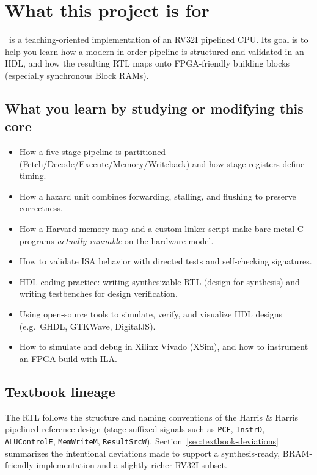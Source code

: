 \section{What this project is for}

\ProjectName\ is a teaching-oriented implementation of an RV32I pipelined CPU.
Its goal is to help you learn how a modern in-order pipeline is structured and
validated in an HDL, and how the resulting RTL maps onto FPGA-friendly building
blocks (especially synchronous Block RAMs).

\subsection{What you learn by studying or modifying this core}
\begin{itemize}[leftmargin=*]
  \item How a five-stage pipeline is partitioned (Fetch/Decode/Execute/Memory/Writeback) and how stage registers define timing.
  \item How a hazard unit combines forwarding, stalling, and flushing to preserve correctness.
  \item How a Harvard memory map and a custom linker script make bare-metal C programs \emph{actually runnable} on the hardware model.
  \item How to validate ISA behavior with directed tests and self-checking signatures.
  \item HDL coding practice: writing synthesizable RTL (design for synthesis) and writing testbenches for design verification.
  \item Using open-source tools to simulate, verify, and visualize HDL designs (e.g.\ GHDL, GTKWave, DigitalJS).
  \item How to simulate and debug in Xilinx Vivado (XSim), and how to instrument an FPGA build with ILA.
\end{itemize}

\subsection{Textbook lineage}
The RTL follows the structure and naming conventions of the Harris \& Harris
pipelined reference design (stage-suffixed signals such as \texttt{PCF},
\texttt{InstrD}, \texttt{ALUControlE}, \texttt{MemWriteM}, \texttt{ResultSrcW}).
Section~\ref{sec:textbook-deviations} summarizes the intentional deviations made
to support a synthesis-ready, BRAM-friendly implementation and a slightly richer
RV32I subset.

